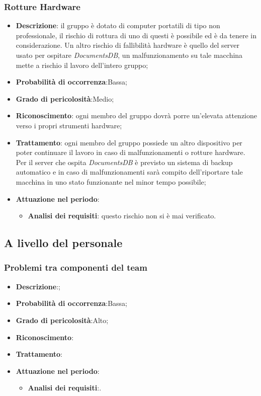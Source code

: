 		\subsubsection{Rotture Hardware}
		\begin{itemize}
			\item \textbf{Descrizione}: il gruppo è dotato di computer portatili di tipo non professionale, il rischio di rottura di uno di questi è possibile ed è da tenere in considerazione. Un altro rischio di fallibilità hardware è quello del server usato per ospitare \textit{DocumentsDB}, un malfunzionamento su tale macchina mette a rischio il lavoro dell'intero gruppo;
			\item \textbf{Probabilità di occorrenza}:Bassa;
			\item \textbf{Grado di pericolosità}:Medio;
			\item \textbf{Riconoscimento}: ogni membro del gruppo dovrà porre un'elevata attenzione verso i propri strumenti hardware;	
			\item \textbf{Trattamento}: ogni membro del gruppo possiede un altro dispositivo per poter continuare il lavoro in caso di malfunzionamenti o rotture hardware. Per il server che ospita \textit{DocumentsDB} è previsto un sistema di backup automatico e in caso di malfunzionamenti sarà compito dell'\Amm riportare tale macchina in uno stato funzionante nel minor tempo possibile;
			\item \textbf{Attuazione nel periodo}:
			\begin{itemize}
				\item \textbf{Analisi dei requisiti}: questo rischio non si è mai verificato.
			\end{itemize}
		\end{itemize}	
	
	\subsection{A livello del personale}
	
		\subsubsection{Problemi tra componenti del team}
		\begin{itemize}
			\item \textbf{Descrizione}:;
			\item \textbf{Probabilità di occorrenza}:Bassa;
			\item \textbf{Grado di pericolosità}:Alto;
			\item \textbf{Riconoscimento}:	
			\item \textbf{Trattamento}:
			\item \textbf{Attuazione nel periodo}:
			\begin{itemize}
				\item \textbf{Analisi dei requisiti}:.
			\end{itemize}
		\end{itemize}
		
